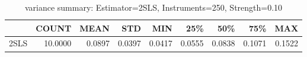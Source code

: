 \begin{table}[ht]
\centering
\caption{variance summary: Estimator=2SLS, Instruments=250, Strength=0.10}
\begin{tabular}{lrrrrrrrr}
\toprule
 & COUNT & MEAN & STD & MIN & 25\% & 50\% & 75\% & MAX \\
\midrule
2SLS & 10.0000 & 0.0897 & 0.0397 & 0.0417 & 0.0555 & 0.0838 & 0.1071 & 0.1522 \\
\bottomrule
\end{tabular}
\end{table}

